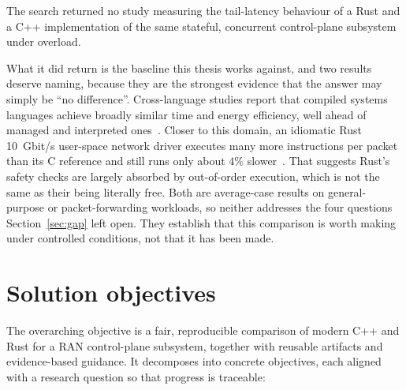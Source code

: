 \documentclass[english,twoside,openright,a4paper,censored,csm,software-track-2020]{HYthesisML}
\begin{document}
The search returned no study measuring the tail-latency behaviour of a Rust and a C++
implementation of the same stateful, concurrent control-plane subsystem under overload.

What it did return is the baseline this thesis works against, and two results deserve naming,
because they are the strongest evidence that the answer may simply be ``no difference''.
Cross-language studies report that compiled systems languages achieve broadly similar time and
energy efficiency, well ahead of managed and interpreted ones~\cite{pereira2017energy}. Closer to
this domain, an idiomatic Rust 10~Gbit/s user-space network driver executes many more
instructions per packet than its C reference and still runs only about $4\%$
slower~\cite{emmerich2019drivers}. That suggests Rust's safety checks are largely absorbed by
out-of-order execution, which is not the same as their being literally free. Both are
average-case results on general-purpose or packet-forwarding workloads, so neither addresses the
four questions Section~\ref{sec:gap} left open. They establish that this comparison is worth
making under controlled conditions, not that it has been made.

\section{Solution objectives}
The overarching objective is a fair, reproducible comparison of modern C++ and Rust for a RAN
control-plane subsystem, together with reusable artifacts and evidence-based guidance. It
decomposes into concrete objectives, each aligned with a research question so that progress is
traceable:
\end{document}
